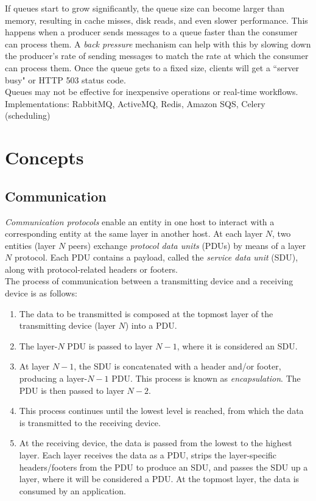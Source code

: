 \documentclass[12pt, titlepage]{article}
\begin{document}
If queues start to grow significantly, the queue size can become larger than memory, resulting in cache misses, disk reads, and even slower performance. This happens when a producer sends messages to a queue faster than the consumer can process them. A \textit{back pressure} mechanism can help with this by slowing down the producer's rate of sending messages to match the rate at which the consumer can process them. Once the queue gets to a fixed size, clients will get a ``server busy" or HTTP 503 status code. \\

Queues may not be effective for inexpensive operations or real-time workflows. \\

Implementations: RabbitMQ, ActiveMQ, Redis, Amazon SQS, Celery (scheduling)

\section{Concepts}

\subsection{Communication}

\textit{Communication protocols} enable an entity in one host to interact with a corresponding entity at the same layer in another host. At each layer $N$, two entities (layer $N$ peers) exchange \textit{protocol data units} (PDUs) by means of a layer $N$ protocol. Each PDU contains a payload, called the \textit{service data unit} (SDU), along with protocol-related headers or footers. \\

The process of communication between a transmitting device and a receiving device is as follows:

\begin{enumerate}
  \item The data to be transmitted is composed at the topmost layer of the transmitting device (layer $N$) into a PDU.
  \item The layer-$N$ PDU is passed to layer $N-1$, where it is considered an SDU.
  \item At layer $N-1$, the SDU is concatenated with a header and/or footer, producing a layer-$N-1$ PDU. This process is known as \textit{encapsulation}. The PDU is then passed to layer $N-2$.
  \item This process continues until the lowest level is reached, from which the data is transmitted to the receiving device.
  \item At the receiving device, the data is passed from the lowest to the highest layer. Each layer receives the data as a PDU, strips the layer-specific headers/footers from the PDU to produce an SDU, and passes the SDU up a layer, where it will be considered a PDU. At the topmost layer, the data is consumed by an application.
\end{enumerate}
\end{document}
